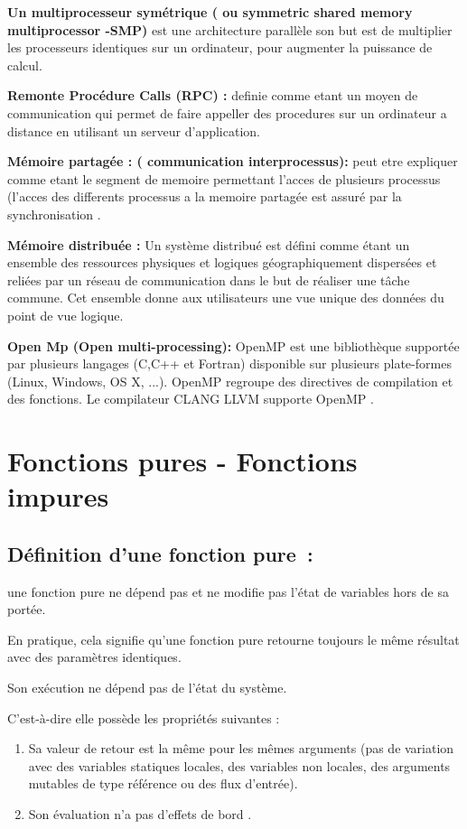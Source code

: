 \documentclass[12pt,titlepage]{article}
\begin{document}
\textbf{ Un multiprocesseur symétrique ( ou symmetric shared memory multiprocessor -SMP) } est une architecture parallèle son but est de multiplier les processeurs identiques sur un ordinateur, pour augmenter la puissance de calcul.

\textbf{ Remonte Procédure Calls (RPC) : } definie comme etant un moyen de communication qui permet de faire appeller des procedures sur un ordinateur a distance en utilisant un serveur d'application.

\textbf{ Mémoire partagée : ( communication interprocessus): }  peut etre expliquer comme etant le segment de memoire permettant l'acces de plusieurs processus (l'acces des differents processus a la memoire partagée est assuré par la synchronisation .

\textbf{ Mémoire distribuée : } Un système distribué est défini comme étant un ensemble des ressources physiques et logiques géographiquement dispersées et reliées par un réseau de communication dans le but de réaliser une tâche commune. Cet ensemble donne aux utilisateurs une vue unique des données du point de vue logique.

\textbf{ Open Mp (Open multi-processing):} OpenMP est une bibliothèque supportée par plusieurs langages (C,C++ et Fortran) disponible sur plusieurs plate-formes (Linux, Windows, OS X, ...). OpenMP regroupe des directives de compilation et des fonctions. Le compilateur CLANG LLVM supporte OpenMP .

\section{Fonctions pures - Fonctions impures}


\subsection{Définition d’une fonction pure :}

une fonction pure ne dépend pas et ne modifie pas l'état de variables hors de sa portée.

En pratique, cela signifie qu'une fonction pure retourne toujours le même résultat avec des paramètres identiques.

Son exécution ne dépend pas de l’état du système.

C'est-à-dire elle possède  les propriétés suivantes :

\begin{enumerate}
	\item Sa valeur de retour est la même pour les mêmes arguments (pas de variation avec des variables statiques locales, des variables non locales, des arguments mutables de type référence ou des flux d'entrée).

	\item Son évaluation n'a pas d'effets de bord .
\end{enumerate}
\end{document}
